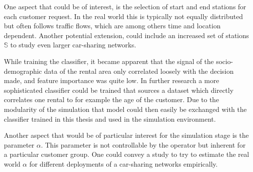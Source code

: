 One aspect that could be of interest, is the selection of start and end stations for
each customer request. In the real world this is typically not equally distributed but
often follows traffic flows, which are among others time and location dependent.
Another potential extension, could include an increased set of stations $\mathbb{S}$ to
study even larger car-sharing networks.

While training the classifier, it became apparent that the signal of the socio-demographic
data of the rental area only correlated loosely with the decision made, and feature importance
was quite low. In further research a more sophisticated classifier could be trained that
sources a dataset which directly correlates one rental to for example the age of the
customer. Due to the modularity of the simulation that model could then easily be
exchanged with the classifier trained in this thesis and used in the simulation 
environment. 

Another aspect that would be of particular interest for the simulation stage is the parameter
$\alpha$. This parameter is not controllable by the operator but inherent for a particular
customer group. One could convey a study to try to estimate the real world $\alpha$ for different
deployments of a car-sharing networks empirically.
